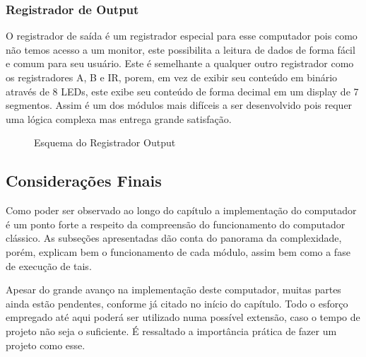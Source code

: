\subsubsection{Registrador de Output}
O registrador de saída é um registrador especial para esse computador pois como não temos acesso a um monitor, este possibilita a leitura de dados de forma fácil e comum para seu usuário.  Este é semelhante a qualquer outro registrador como os registradores A, B e IR, porem, em vez de exibir seu conteúdo em binário através de 8 LEDs, este exibe seu conteúdo de forma decimal em um display de 7 segmentos. Assim é um dos módulos mais difíceis a ser desenvolvido pois requer uma lógica complexa mas entrega grande satisfação.

\vspace{1cm}
\begin{figure}[H] \centering 
  \caption{\label{schematics_output} Esquema do Registrador Output} 
\end{figure}


\subsection{Considerações Finais}

Como poder ser observado ao longo do capítulo a implementação do computador é um ponto forte a respeito da compreensão do funcionamento do computador clássico. As subseções apresentadas dão conta do panorama da complexidade, porém, explicam bem o funcionamento de cada módulo, assim bem como a fase de execução de tais.

Apesar do grande avanço na implementação deste computador, muitas partes ainda estão pendentes, conforme já citado no início do capítulo. Todo o esforço empregado até aqui poderá ser utilizado numa possível extensão, caso o tempo de projeto não seja o suficiente. É ressaltado a importância prática de fazer um projeto como esse.


\newpage


